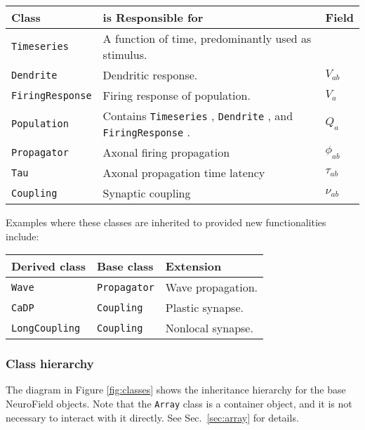 \documentclass[12pt,a4paper]{article}
\newcommand{\type}[1]{{\small\small\tt #1} }
\begin{document}
\begin{tabular}{l l l}
    Class&is Responsible for&Field\\
    \hline
    \type{Timeseries}&A function of time, predominantly used as stimulus.&\\
    \type{Dendrite}&Dendritic response.&$V_{ab}$\\
    \type{FiringResponse}&Firing response of population.&$V_a$\\
    \type{Population}&Contains \type{Timeseries}, \type{Dendrite}, and \type{FiringResponse}.&$Q_a$\\
    \type{Propagator}&Axonal firing propagation&$\phi_{ab}$\\
    \type{Tau}&Axonal propagation time latency&$\tau_{ab}$\\
    \type{Coupling}&Synaptic coupling&$\nu_{ab}$
\end{tabular}

Examples where these classes are inherited to provided new functionalities include:

\begin{tabular}{l l l}
    Derived class&Base class&Extension\\
    \hline
    \type{Wave}&\type{Propagator}&Wave propagation.\\
    \type{CaDP}&\type{Coupling}&Plastic synapse.\\
    \type{LongCoupling}&\type{Coupling}&Nonlocal synapse.
\end{tabular}

\subsubsection{Class hierarchy}
The diagram in Figure \ref{fig:classes} shows the inheritance hierarchy for the base NeuroField objects. Note that the \type{Array} class is a container object, and it is not necessary to interact with it directly. See Sec.~\ref{sec:array} for details.
\end{document}
